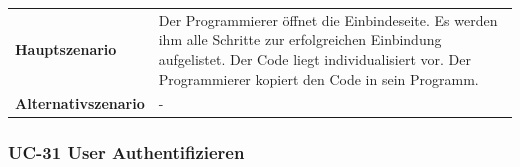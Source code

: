 \begin{longtable}[c]{@{}ll@{}}
\begin{minipage}[t]{0.34\columnwidth}\raggedright\strut
\textbf{Hauptszenario}
\strut\end{minipage} &
\begin{minipage}[t]{0.60\columnwidth}\raggedright\strut
Der Programmierer öffnet die Einbindeseite. Es werden ihm alle Schritte
zur erfolgreichen Einbindung aufgelistet. Der Code liegt
individualisiert vor. Der Programmierer kopiert den Code in sein
Programm.
\strut\end{minipage}\tabularnewline
\begin{minipage}[t]{0.34\columnwidth}\raggedright\strut
\textbf{Alternativszenario}
\strut\end{minipage} &
\begin{minipage}[t]{0.60\columnwidth}\raggedright\strut
-
\strut\end{minipage}\tabularnewline
\bottomrule
\end{longtable}

\subsubsection{UC-31 User
Authentifizieren}\label{uc-31-user-authentifizieren}

